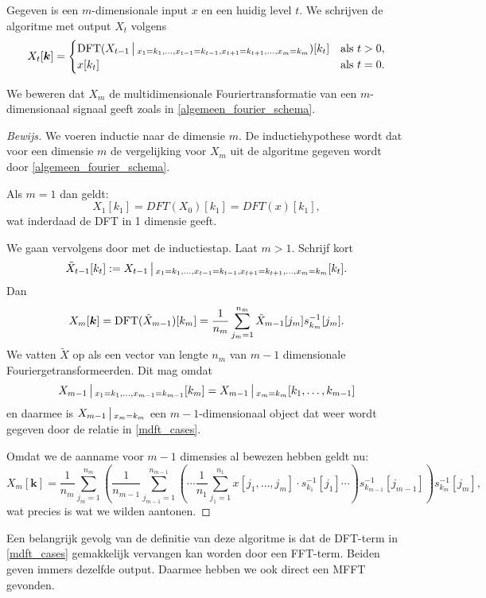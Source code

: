\begin{algo}
Gegeven is een $m$-dimensionale input $x$ en een huidig level $t$. We schrijven de algoritme met output $X_t$ volgens
\begin{equation}
  \label{mdft_cases}
  X_{t}[\boldsymbol k] = \begin{cases}
  \text{DFT}(X_{t-1}\,\big|\,_{x_1 = k_1,\ldots,x_{t-1} = k_{t-1},x_{t+1} = k_{t+1},\ldots,x_m =k_m})[k_t] & \text{als } t>0,\\
  x[k_t] & \text{als } t=0.
  \end{cases}
\end{equation}

We beweren dat $X_m$ de multidimensionale Fouriertransformatie van een $m$-dimensionaal signaal geeft zoals
in \eqref{algemeen_fourier_schema}.
\end{algo}
\begin{proof}[Bewijs]
We voeren inductie naar de dimensie $m$. De inductiehypothese wordt dat voor een dimensie $m$ 
de vergelijking voor $X_m$ uit de algoritme gegeven wordt door \eqref{algemeen_fourier_schema}.

Als $m=1$ dan geldt:
\[
X_1[k_1] = DFT(X_0)[k_1] = DFT(x)[k_1],
\]
wat inderdaad de DFT in 1 dimensie geeft.


We gaan vervolgens door met de inductiestap. Laat $m > 1$. Schrijf kort
\[
\tilde X_{t-1}[k_t] := 
X_{t-1}\,\big|\,_{x_1 = k_1,\ldots,x_{t-1} = k_{t-1},x_{t+1} = k_{t+1},\ldots,x_m =k_m}[k_t].
\]
Dan
\[
  X_m [\boldsymbol k] = 
  \text{DFT}(\tilde X_{m-1})[k_m]
  = \frac 1 {n_m}\sum_{j_m=1}^{n_m} \tilde X_{m-1}[j_m] s^{-1}_{k_m}[j_m].
\]
We vatten $\tilde X$ op als een vector van lengte $n_m$ van $m-1$ dimensionale Fouriergetransformeerden.
Dit mag omdat
\[
X_{m-1}\,\big|\,_{x_1=k_1,\ldots,x_{m-1}=k_{m-1}}[k_m] = X_{m-1}\,\big|\,_{x_m=k_m}[k_1,\ldots,k_{m-1}]
\]
en daarmee is $X_{m-1}\,\big|\,_{x_m=k_m}$ een $m-1$-dimensionaal object dat weer wordt gegeven door de relatie
in \eqref{mdft_cases}.

Omdat we de aanname voor $m-1$ dimensies al bewezen hebben geldt nu:
\[
X_m[\boldsymbol k]  = \frac 1 {n_m}\sum_{j_m=1}^{n_m} 
\left( \frac 1 {n_{m-1}} \sum_{j_{m-1}=1}^{n_{m-1}} \left ( \cdots 
\frac 1 {n_1} \sum_{j_1=1}^{n_1} 
x[j_1,\ldots,j_m] 
\cdot s^{-1}_{k_1}[j_1]
\cdots \right ) s^{-1}_{k_{m-1}}[j_{m-1}] \right) 
s^{-1}_{k_m}[j_m],
\]
wat precies is wat we wilden aantonen.
\end{proof}

Een belangrijk gevolg van de definitie van deze algoritme is dat de DFT-term in \eqref{mdft_cases}
gemakkelijk vervangen kan worden door een FFT-term. Beiden geven immers dezelfde output. 
Daarmee hebben we ook direct een MFFT gevonden.

